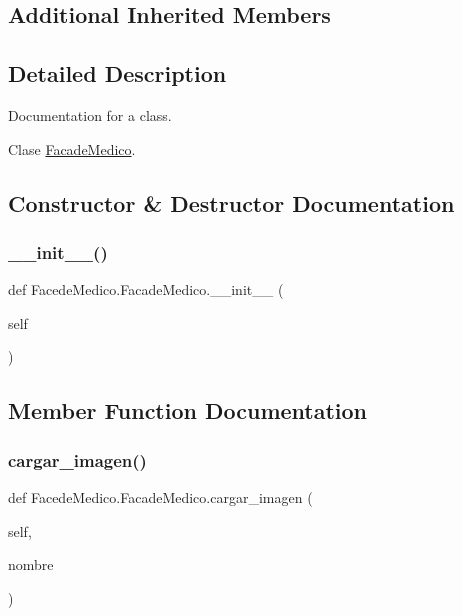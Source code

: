 \subsection*{Additional Inherited Members}


\subsection{Detailed Description}
Documentation for a class. 

Clase \mbox{\hyperlink{class_facede_medico_1_1_facade_medico}{Facade\+Medico}}. 

\subsection{Constructor \& Destructor Documentation}
\mbox{\label{class_facede_medico_1_1_facade_medico_a461dbe3bea34efedec3c2425e48982da}} 
\subsubsection{\texorpdfstring{\+\_\+\+\_\+init\+\_\+\+\_\+()}{\_\_init\_\_()}}
{\footnotesize\ttfamily def Facede\+Medico.\+Facade\+Medico.\+\_\+\+\_\+init\+\_\+\+\_\+ (\begin{DoxyParamCaption}\item[{}]{self }\end{DoxyParamCaption})}



\subsection{Member Function Documentation}
\mbox{\label{class_facede_medico_1_1_facade_medico_a012407bf5a1b178924a8d3dfcc9e579c}} 
\subsubsection{\texorpdfstring{cargar\+\_\+imagen()}{cargar\_imagen()}}
{\footnotesize\ttfamily def Facede\+Medico.\+Facade\+Medico.\+cargar\+\_\+imagen (\begin{DoxyParamCaption}\item[{}]{self,  }\item[{}]{nombre }\end{DoxyParamCaption})}



